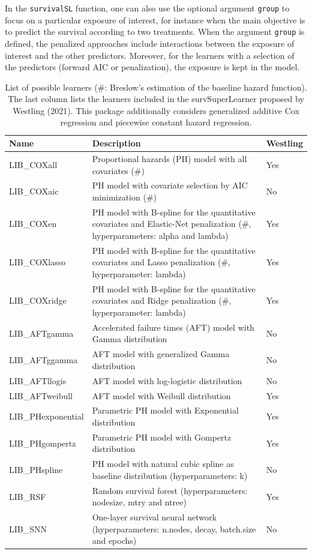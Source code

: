 In the \texttt{survivalSL} function, one can also use the optional argument \texttt{group} to focus on a particular exposure of interest, for instance when the main objective is to predict the survival according to two treatments. When the argument \texttt{group} is defined, the penalized approaches include interactions between the exposure of interest and the other predictors. Moreover, for the learners with a selection of the predictors (forward AIC or penalization), the exposure is kept in the model.

\begin{table}
\centering
\caption{\label{tab:listemeth-tab-static}List of possible learners (\#: Breslow's estimation of the baseline hazard function). The last column lists the learners included in the survSuperLearner proposed by Westling (2021). This package additionally considers generalized additive Cox regression and piecewise constant hazard regression.}
\centering
\fontsize{8}{10}\selectfont
\begin{tabular}[t]{l>{\raggedright\arraybackslash}p{8cm}l}
\toprule
Name & Description & Westling\\
\midrule
LIB\_COXall & Proportional hazards (PH) model with all covariates (\#) & Yes\\
LIB\_COXaic & PH model with covariate selection by AIC minimization (\#) & No\\
LIB\_COXen & PH model with B-spline for the quantitative covariates and Elastic-Net penalization (\#, hyperparameters: alpha and lambda) & Yes\\
LIB\_COXlasso & PH model with B-spline for the quantitative covariates and Lasso penalization (\#, hyperparameter: lambda) & Yes\\
LIB\_COXridge & PH model with B-spline for the quantitative covariates and Ridge penalization (\#, hyperparameter: lambda) & Yes\\
\addlinespace
LIB\_AFTgamma & Accelerated failure times (AFT) model with Gamma distribution & No\\
LIB\_AFTggamma & AFT model with generalized Gamma distribution & No\\
LIB\_AFTllogis & AFT model with log-logistic distribution & No\\
LIB\_AFTweibull & AFT model with Weibull distribution & Yes\\
LIB\_PHexponential & Parametric PH model with Exponential distribution & Yes\\
\addlinespace
LIB\_PHgompertz & Parametric PH model with Gompertz distribution & Yes\\
LIB\_PHspline & PH model with natural cubic spline as baseline distribution (hyperparameters: k) & No\\
LIB\_RSF & Random survival forest (hyperparameters: nodesize, mtry and ntree) & Yes\\
LIB\_SNN & One-layer survival neural network (hyperparameters: n.nodes, decay, batch.size and epochs) & No\\
\bottomrule
\end{tabular}
\end{table}


